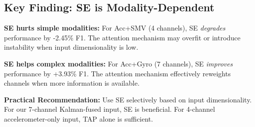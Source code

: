 \documentclass{article}
\begin{document}
\begin{table}[htbp]
    \centering
    \caption{SE module ablation: SE+TAP vs TAP-only across different input modalities (22-fold LOSO). All values in [\%].}
    \label{tab:se_ablation_modality}
    \small
\end{table}

\subsection{Key Finding: SE is Modality-Dependent}

\begin{tcolorbox}[colback=orange!5,colframe=orange!50!black,title=\textbf{Critical Finding: SE Module Effect Depends on Input Complexity}]
\textbf{SE hurts simple modalities:} For Acc+SMV (4 channels), SE \textit{degrades} performance by -2.45\% F1. The attention mechanism may overfit or introduce instability when input dimensionality is low.

\textbf{SE helps complex modalities:} For Acc+Gyro (7 channels), SE \textit{improves} performance by +3.93\% F1. The attention mechanism effectively reweights channels when more information is available.

\textbf{Practical Recommendation:} Use SE selectively based on input dimensionality. For our 7-channel Kalman-fused input, SE is beneficial. For 4-channel accelerometer-only input, TAP alone is sufficient.
\end{tcolorbox}
\end{document}
